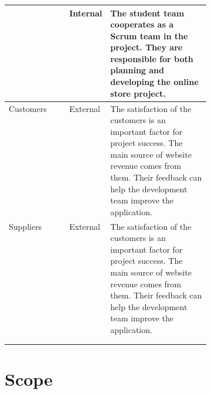 \documentclass{report}
\begin{document}
\begin{tabularx}{0.95\linewidth}{%
  >{\raggedright\arraybackslash}p{0.3\linewidth}%
  >{\raggedright\arraybackslash}p{0.1\linewidth}%
  >{\raggedright\arraybackslash}X}
  & Internal
  & The student team cooperates as a Scrum team in the project. They are responsible for both planning and developing the online store project. 
  \\
  \midrule
  Customers
  & External
  & The satisfaction of the customers is an important factor for project success. The main source of website revenue comes from them. Their feedback can help the development team improve the application.
  \\
  \midrule
  Suppliers
  & External
  & The satisfaction of the customers is an important factor for project success. The main source of website revenue comes from them. Their feedback can help the development team improve the application.
  \\
  \bottomrule
  \\
  \caption{Stakeholder Register}  
  \label{tab:stakeholderRegister}
\end{tabularx}

\section{Scope}
\end{document}
